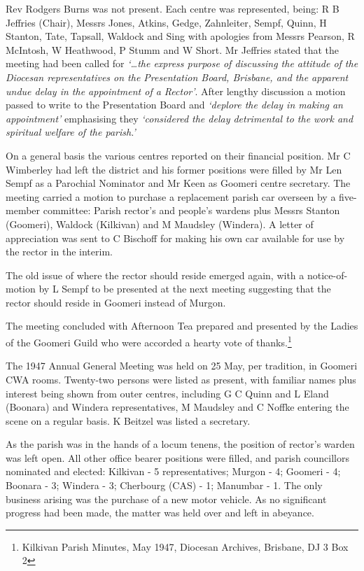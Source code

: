 Rev Rodgers Burns was not present. Each centre was represented, being: R B Jeffries (Chair), Messrs Jones, Atkins, Gedge, Zahnleiter, Sempf, Quinn, H Stanton, Tate, Tapsall, Waldock and Sing with apologies from Messrs Pearson, R McIntosh, W Heathwood, P Stumm and W Short. Mr Jeffries stated that the meeting had been called for \emph{`\ldots the express purpose of discussing the attitude of the Diocesan representatives on the Presentation Board, Brisbane, and the apparent undue delay in the appointment of a Rector'}. After lengthy discussion a motion passed to write to the Presentation Board and \emph{`deplore the delay in making an appointment'} emphasising they \emph{`considered the delay detrimental to the work and spiritual welfare of the parish.'}

On a general basis the various centres reported on their financial position. Mr C Wimberley had left the district and his former positions were filled by Mr Len Sempf as a Parochial Nominator and Mr Keen as Goomeri centre secretary. The meeting carried a motion to purchase a replacement parish car overseen by a five-member committee: Parish rector's and people's wardens plus Messrs Stanton (Goomeri), Waldock (Kilkivan) and M Maudsley (Windera). A letter of appreciation was sent to C Bischoff for making his own car available for use by the rector in the interim.

The old issue of where the rector should reside emerged again, with a notice-of-motion by L Sempf to be presented at the next meeting suggesting that the rector should reside in Goomeri instead of Murgon.

The meeting concluded with Afternoon Tea prepared and presented by the Ladies of the Goomeri Guild who were accorded a hearty vote of thanks.\footnote{Kilkivan Parish Minutes, May 1947, Diocesan Archives, Brisbane, DJ 3 Box 2}

The 1947 Annual General Meeting was held on 25 May, per tradition, in Goomeri CWA rooms. Twenty-two persons were listed as present, with familiar names plus interest being shown from outer centres, including G C Quinn and L Eland (Boonara) and Windera representatives, M Maudsley and C Noffke entering the scene on a regular basis. K Beitzel was listed a secretary.

As the parish was in the hands of a locum tenens, the position of rector's warden was left open. All other office bearer positions were filled, and parish councillors nominated and elected: Kilkivan - 5 representatives; Murgon - 4; Goomeri - 4; Boonara - 3; Windera - 3; Cherbourg (CAS) - 1; Manumbar - 1. The only business arising was the purchase of a new motor vehicle. As no significant progress had been made, the matter was held over and left in abeyance.

